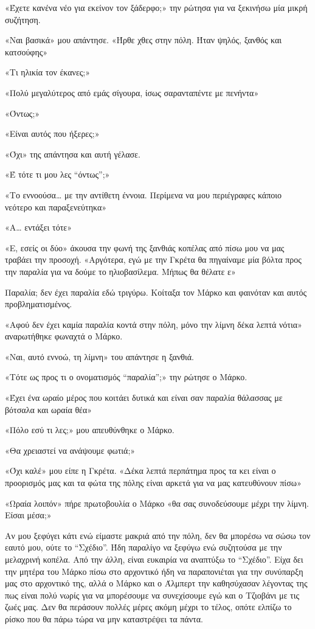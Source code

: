 \documentclass[12pt,twoside, openany]{book}
\begin{document}
«Έχετε κανένα νέο για εκείνον τον ξάδερφο;» την ρώτησα για να ξεκινήσω μία μικρή συζήτηση.

«Ναι βασικά» μου απάντησε. «Ήρθε χθες στην πόλη. Ήταν ψηλός, ξανθός και κατσούφης»

«Τι ηλικία τον έκανες;»

«Πολύ μεγαλύτερος από εμάς σίγουρα, ίσως σαρανταπέντε με πενήντα»

«Όντως;»

«Είναι αυτός που ήξερες;»

«Όχι» της απάντησα και αυτή γέλασε.

«Έ τότε τι μου λες “όντως”;»

«Το εννοούσα… με την αντίθετη έννοια. Περίμενα να μου περιέγραφες κάποιο νεότερο και παραξενεύτηκα»

«Α… εντάξει τότε»

«Ε, εσείς οι δύο» άκουσα την φωνή της ξανθιάς κοπέλας από πίσω μου να μας τραβάει την προσοχή. «Αργότερα, εγώ με την Γκρέτα θα πηγαίναμε μία βόλτα προς την παραλία για να δούμε το ηλιοβασίλεμα. Μήπως θα θέλατε ε»

Παραλία; δεν έχει παραλία εδώ τριγύρω. Κοίταξα τον Μάρκο και φαινόταν και αυτός προβληματισμένος.

«Αφού δεν έχει καμία παραλία κοντά στην πόλη, μόνο την λίμνη δέκα λεπτά νότια» αναρωτήθηκε φωναχτά ο Μάρκο.

«Ναι, αυτό εννοώ, τη λίμνη» του απάντησε η ξανθιά.

«Τότε ως προς τι ο ονοματισμός “παραλία”;» την ρώτησε ο Μάρκο.

«Έχει ένα ωραίο μέρος που κοιτάει δυτικά και είναι σαν παραλία θάλασσας με βότσαλα και ωραία θέα»

«Πόλο εσύ τι λες;» μου απευθύνθηκε ο Μάρκο.

«Θα χρειαστεί να ανάψουμε φωτιά;»

«Όχι καλέ» μου είπε η Γκρέτα. «Δέκα λεπτά περπάτημα προς τα κει είναι ο προορισμός μας και τα φώτα της πόλης είναι αρκετά για να μας κατευθύνουν πίσω»

«Ωραία λοιπόν» πήρε πρωτοβουλία ο Μάρκο «θα σας συνοδεύσουμε μέχρι την λίμνη. Είσαι μέσα;»

Αν μου ξεφύγει κάτι ενώ είμαστε μακριά από την πόλη, δεν θα μπορέσω να σώσω τον εαυτό μου, ούτε το “Σχέδιο”. Ήδη παραλίγο να ξεφύγω ενώ συζητούσα με την μελαχρινή κοπέλα. Από την άλλη, είναι ευκαιρία να αναπτύξω το “Σχέδιο”. Είχα δει την μητέρα του Μάρκο πίσω στο αρχοντικό ήδη να παραπονιέται για την συνύπαρξη μας στο αρχοντικό της, αλλά ο Μάρκο και ο Άλμπερτ την καθησύχασαν λέγοντας της πως είναι πολύ νωρίς για να μπορέσουμε να συνεχίσουμε εγώ και ο Τζιοβάνι με τις ζωές μας. Δεν θα περάσουν πολλές μέρες ακόμη μέχρι το τέλος, οπότε ελπίζω το ρίσκο που θα πάρω τώρα να μην καταστρέψει τα πάντα.
\end{document}
